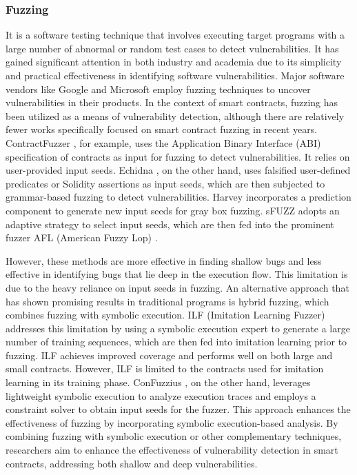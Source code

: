 \documentclass[manuscript,screen]{acmart}
\begin{document}
\subsubsection{Fuzzing}
It is a software testing technique that involves executing target programs with a large number of abnormal or random test cases to detect vulnerabilities. It has gained significant attention in both industry and academia \cite{LiJCLLCLWBCL021, HeBATV19} due to its simplicity and practical effectiveness in identifying software vulnerabilities. Major software vendors like Google  \cite{oss-fuzz} and Microsoft \cite{onefuzz} employ fuzzing techniques to uncover vulnerabilities in their products. 
In the context of smart contracts, fuzzing has been utilized as a means of vulnerability detection, although there are relatively fewer works specifically focused on smart contract fuzzing in recent years. ContractFuzzer \cite{0001LC18}, for example, uses the Application Binary Interface (ABI) specification of contracts as input for fuzzing to detect vulnerabilities. It relies on user-provided input seeds. Echidna \cite{echidna}, on the other hand, uses falsified user-defined predicates or Solidity assertions as input seeds, which are then subjected to grammar-based fuzzing to detect vulnerabilities. Harvey \cite{WustholzC20} incorporates a prediction component to generate new input seeds for gray box fuzzing. sFUZZ \cite{NguyenP0L020} adopts an adaptive strategy to select input seeds, which are then fed into the prominent fuzzer AFL (American Fuzzy Lop) \cite{AFL}.

However, these methods are more effective in finding shallow bugs and less effective in identifying bugs that lie deep in the execution flow. This limitation is due to the heavy reliance on input seeds in fuzzing. An alternative approach that has shown promising results in traditional programs is hybrid fuzzing, which combines fuzzing with symbolic execution. 
ILF (Imitation Learning Fuzzer)  \cite{HeBATV19} addresses this limitation by using a symbolic execution expert to generate a large number of training sequences, which are then fed into imitation learning prior to fuzzing. ILF achieves improved coverage and performs well on both large and small contracts. However, ILF is limited to the contracts used for imitation learning in its training phase. 
ConFuzzius \cite{TorresIGS21}, on the other hand, leverages lightweight symbolic execution to analyze execution traces and employs a constraint solver to obtain input seeds for the fuzzer. This approach enhances the effectiveness of fuzzing by incorporating symbolic execution-based analysis. 
By combining fuzzing with symbolic execution or other complementary techniques, researchers aim to enhance the effectiveness of vulnerability detection in smart contracts, addressing both shallow and deep vulnerabilities.
\end{document}
